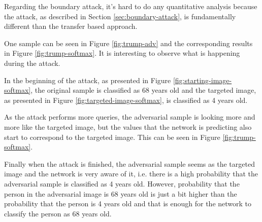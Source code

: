 \begin{table}[]
\caption{Substitute network: InceptionResNetV2 architecture with Adam optimizer; Attack: CW}
\label{table:bbox-inception-adam-cw}
\end{table}

Regarding the boundary attack, it's hard to do any quantitative analysis because the attack, as described in Section \ref{sec:boundary-attack}, is fundamentally different than the transfer based approach. 

One sample can be seen in Figure \ref{fig:trump-adv} and the corresponding results in Figure \ref{fig:trump-softmax}. It is interesting to observe what is happening during the attack. 

In the beginning of the attack, as presented in Figure \ref{fig:starting-image-softmax}, the original sample is classified as 68 years old and the targeted image, as presented in Figure \ref{fig:targeted-image-softmax}, is classified as 4 years old. 

As the attack performs more queries, the adversarial sample is looking more and more like the targeted image, but the values that the network is predicting also start to correspond to the targeted image. This can be seen in Figure \ref{fig:trump-softmax}.

Finally when the attack is finished, the adversarial sample seems as the targeted image and the network is very aware of it, i.e. there is a high probability that the adversarial sample is classified as 4 years old. However, probability that the person in the adversarial image is 68 years old is just a bit higher than the probability that the person is 4 years old and that is enough for the network to classify the person as 68 years old. 

